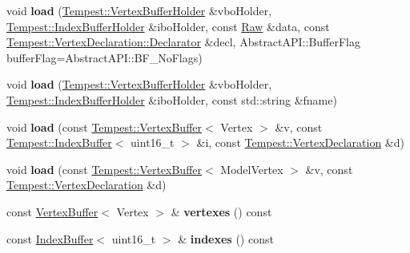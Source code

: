 \begin{DoxyCompactItemize}
\item 
\hypertarget{class_tempest_1_1_model_a04e8562a09de8cb7094bf41161ab575d}{void {\bfseries load} (\hyperlink{class_tempest_1_1_vertex_buffer_holder}{Tempest\+::\+Vertex\+Buffer\+Holder} \&vbo\+Holder, \hyperlink{class_tempest_1_1_index_buffer_holder}{Tempest\+::\+Index\+Buffer\+Holder} \&ibo\+Holder, const \hyperlink{struct_tempest_1_1_raw_model}{Raw} \&data, const \hyperlink{class_tempest_1_1_vertex_declaration_1_1_declarator}{Tempest\+::\+Vertex\+Declaration\+::\+Declarator} \&decl, Abstract\+A\+P\+I\+::\+Buffer\+Flag buffer\+Flag=Abstract\+A\+P\+I\+::\+B\+F\+\_\+\+No\+Flags)}\label{class_tempest_1_1_model_a04e8562a09de8cb7094bf41161ab575d}

\item 
\hypertarget{class_tempest_1_1_model_adcff6e557a566dcd92ffa4ca2a7de9d1}{void {\bfseries load} (\hyperlink{class_tempest_1_1_vertex_buffer_holder}{Tempest\+::\+Vertex\+Buffer\+Holder} \&vbo\+Holder, \hyperlink{class_tempest_1_1_index_buffer_holder}{Tempest\+::\+Index\+Buffer\+Holder} \&ibo\+Holder, const std\+::string \&fname)}\label{class_tempest_1_1_model_adcff6e557a566dcd92ffa4ca2a7de9d1}

\item 
\hypertarget{class_tempest_1_1_model_a98d8268bde1100749871000e87995f44}{void {\bfseries load} (const \hyperlink{class_tempest_1_1_vertex_buffer}{Tempest\+::\+Vertex\+Buffer}$<$ Vertex $>$ \&v, const \hyperlink{class_tempest_1_1_index_buffer}{Tempest\+::\+Index\+Buffer}$<$ uint16\+\_\+t $>$ \&i, const \hyperlink{class_tempest_1_1_vertex_declaration}{Tempest\+::\+Vertex\+Declaration} \&d)}\label{class_tempest_1_1_model_a98d8268bde1100749871000e87995f44}

\item 
\hypertarget{class_tempest_1_1_model_a539f38d517daa18f885210e0f8c1f56c}{void {\bfseries load} (const \hyperlink{class_tempest_1_1_vertex_buffer}{Tempest\+::\+Vertex\+Buffer}$<$ Model\+Vertex $>$ \&v, const \hyperlink{class_tempest_1_1_vertex_declaration}{Tempest\+::\+Vertex\+Declaration} \&d)}\label{class_tempest_1_1_model_a539f38d517daa18f885210e0f8c1f56c}

\item 
\hypertarget{class_tempest_1_1_model_a0f02d911bc4a510abc613ec6c74fcbc3}{const \hyperlink{class_tempest_1_1_vertex_buffer}{Vertex\+Buffer}$<$ Vertex $>$ \& {\bfseries vertexes} () const }\label{class_tempest_1_1_model_a0f02d911bc4a510abc613ec6c74fcbc3}

\item 
\hypertarget{class_tempest_1_1_model_afbb56bbf5eb1c3d3d25caa7901e7973b}{const \hyperlink{class_tempest_1_1_index_buffer}{Index\+Buffer}$<$ uint16\+\_\+t $>$ \& {\bfseries indexes} () const }\label{class_tempest_1_1_model_afbb56bbf5eb1c3d3d25caa7901e7973b}


\end{DoxyCompactItemize}
